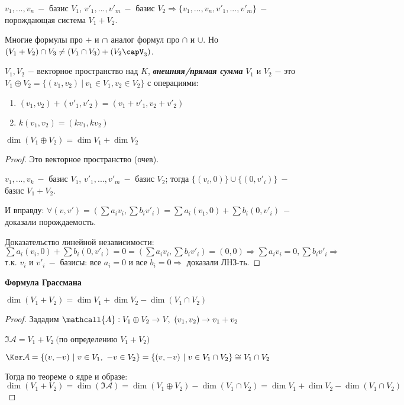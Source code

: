 \begin{remark}
    $v_1,...,v_n\ -$ базис $V_1$, $v'_1,...,v'_m\ -$ базис $V_2\Rightarrow 
\{v_1,...,v_n,v'_1,...,v'_m\}\ -$ порождающая система $V_1+V_2$.
\end{remark}

\begin{remark}
    Многие формулы про $+$ и $\cap \-$ аналог формул про $\cap$ и $\cup$. 
Но $(V_1+V_2)\cap V_3\neq(V_1\cap V_3)+(V_2\capV_3)$.
\end{remark}

\begin{definition}
    $V_1,V_2$ $-$ векторное пространство над $K$, 
\textbf{\textit{внешняя/прямая сумма}} $V_1$ и $V_2$ $-$ это $V_1\oplus 
V_2=\{(v_1,v_2)\ |\ v_1\in V_1,v_2\in V_2\}$ с операциями:
    \begin{enumerate}
        \item $(v_1,v_2)+(v'_1,v'_2)=(v_1+v'_1,v_2+v'_2)$
        \item $k(v_1,v_2)=(kv_1,kv_2)$
    \end{enumerate}
\end{definition}

\begin{statement}
    $\dim (V_1\oplus V_2)=\dim V_1 + \dim V_2$
\end{statement}

\begin{proof}
    Это векторное пространство (очев).

    $v_1,...,v_k\ -$ базис $V_1$, $v'_1,...,v'_m\ -$ базис $V_2$; тогда 
$\{(v_i,0)\}\cup \{(0,v'_i)\}\ -$ базис $V_1+V_2$.

    И вправду: $\forall (v,v')=(\sum a_iv_i, \sum b_iv'_i)=\sum 
a_i(v_1,0)+\sum b_i(0,v'_i)\ -$ доказали порождаемость.

    Доказательство линейной независимости: $\sum a_i(v_i,0)+\sum 
b_i(0,v'_i)=0=(\sum a_iv_i,\sum b_iv'_i)=(0,0)\Rightarrow \sum 
a_iv_i=0,\sum b_iv'_i\Rightarrow $ т.к. $v_i$ и $v'_i\ -$ базисы: все 
$a_i=0$ и все $b_i=0\Rightarrow $ доказали ЛНЗ-ть.
\end{proof}

\begin{theorem} \textbf{Формула Грассмана}

    $\dim(V_1+ V_2)=\dim V_1+\dim V_2-\dim (V_1\cap V_2)$
\end{theorem}

\begin{proof}
    Зададим $\mathcall{A}:V_1\oplus V_2\rightarrow V,\ 
(v_1,v_2)\rightarrow v_1+v_2$
    
    $\Im \mathcal{A}=V_1+V_2\ ($по определению $V_1+V_2)$

    $\Ker \mathcal{A}=\{(v,-v)\ |\ v\in V_1,\ -v\in V_2\}=\{(v,-v)\ |\ 
v\in V_1\cap V_2\}\cong V_1\cap V_2$

    Тогда по теореме о ядре и образе: $\dim 
(V_1+V_2)=\dim(\Im\mathcal{A})=\dim(V_1\oplus V_2)-\dim (V_1\cap V_2)=\dim 
V_1+\dim V_2-\dim (V_1\cap V_2)$
\end{proof}

